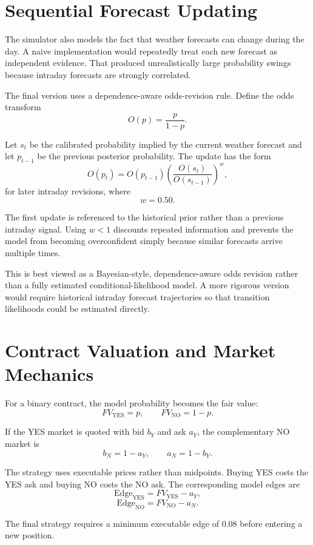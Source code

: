 \documentclass[11pt]{article}
\begin{document}
\section{Sequential Forecast Updating}

The simulator also models the fact that weather forecasts can change during the day. A naive implementation would repeatedly treat each new forecast as independent evidence. That produced unrealistically large probability swings because intraday forecasts are strongly correlated.

The final version uses a dependence-aware odds-revision rule. Define the odds transform
\[
O(p)=\frac{p}{1-p}.
\]

Let $s_t$ be the calibrated probability implied by the current weather forecast and let $p_{t-1}$ be the previous posterior probability. The update has the form
\[
O(p_t)
=
O(p_{t-1})
\left(
\frac{O(s_t)}{O(s_{t-1})}
\right)^w,
\]
for later intraday revisions, where
\[
w=0.50.
\]

The first update is referenced to the historical prior rather than a previous intraday signal. Using $w<1$ discounts repeated information and prevents the model from becoming overconfident simply because similar forecasts arrive multiple times.

This is best viewed as a Bayesian-style, dependence-aware odds revision rather than a fully estimated conditional-likelihood model. A more rigorous version would require historical intraday forecast trajectories so that transition likelihoods could be estimated directly.

\section{Contract Valuation and Market Mechanics}

For a binary contract, the model probability becomes the fair value:
\[
FV_{\text{YES}} = p,
\qquad
FV_{\text{NO}} = 1-p.
\]

If the YES market is quoted with bid $b_Y$ and ask $a_Y$, the complementary NO market is
\[
b_N = 1-a_Y,
\qquad
a_N = 1-b_Y.
\]

The strategy uses executable prices rather than midpoints. Buying YES costs the YES ask and buying NO costs the NO ask. The corresponding model edges are
\[
\text{Edge}_{\text{YES}} = FV_{\text{YES}} - a_Y,
\]
\[
\text{Edge}_{\text{NO}} = FV_{\text{NO}} - a_N.
\]

The final strategy requires a minimum executable edge of 0.08 before entering a new position.
\end{document}
